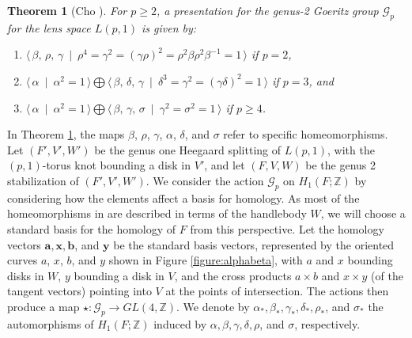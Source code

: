 \documentclass{amsart}     %
\newtheorem{thm}{Theorem}[section]    %
\theoremstyle{definition}
\begin{document}
\begin{thm}[Cho \cite{ChoG2GGLS}]\label{thm:Cho}
For $p \ge 2$, a presentation for the genus-2 Goeritz group $\mathcal G_p$ for the lens space $L(p,1)$ is given by:
\begin{enumerate}
\item $\langle \, \beta, \, \rho, \, \gamma \ \mid \ \rho^4 = \gamma^2 = (\gamma \rho)^2 = \rho^2 \beta \rho^2 \beta^{-1} = 1 \, \rangle$ if $p = 2$, 
\item $\langle \, \alpha \ \mid \ \alpha^2 = 1 \, \rangle \bigoplus \langle \, \beta, \, \delta, \, \gamma \ \mid \ \delta^3 = \gamma^2 = (\gamma \delta)^2 = 1 \, \rangle$ if $p = 3$, and
\item $\langle \, \alpha \ \mid \ \alpha^2 = 1 \, \rangle \bigoplus \langle \, \beta, \, \gamma, \, \sigma \ \mid \ \gamma^2 = \sigma^2 = 1 \, \rangle$ if $p \ge 4$.
\end{enumerate}
\end{thm}
%
In Theorem \ref{thm:Cho}, the maps $\beta$, $\rho$, $\gamma$, $\alpha$, $\delta$, and $\sigma$ refer to specific homeomorphisms. Let $(F', V', W')$ be the genus one Heegaard splitting of $L(p, 1)$, with the $(p, 1)$-torus knot bounding a disk in $V'$, and let $(F, V, W)$ be the genus 2 stabilization of $(F', V', W')$. We consider the action $\mathcal G_p$ on $H_1(F; \mathbb Z)$ by considering how the elements affect a basis for homology. As most of the homeomorphisms in \cite{ChoG2GGLS} are described in terms of the handlebody $W$, we will choose a standard basis for the homology of $F$ from this perspective. Let the homology vectors $\textbf{a}, \textbf{x}, \textbf{b}$, and $\textbf{y}$ be the standard basis vectors, represented by the oriented curves $a$, $x$, $b$, and $y$ shown in Figure \ref{figure:alphabeta}, with $a$ and $x$ bounding disks in $W$, $y$ bounding a disk in $V$, and the cross products $a \times b$ and $x \times y$ (of the tangent vectors) pointing into $V$ at the points of intersection. The actions then produce a map $\star: \mathcal{G}_p \to GL(4, \mathbb Z)$. We denote by $\alpha_*, \beta_*, \gamma_*, \delta_*, \rho_*$, and $\sigma_*$ the automorphisms of $H_1(F; \mathbb{Z})$ induced by $\alpha, \beta, \gamma, \delta, \rho$, and $\sigma$, respectively. 
\end{document}
